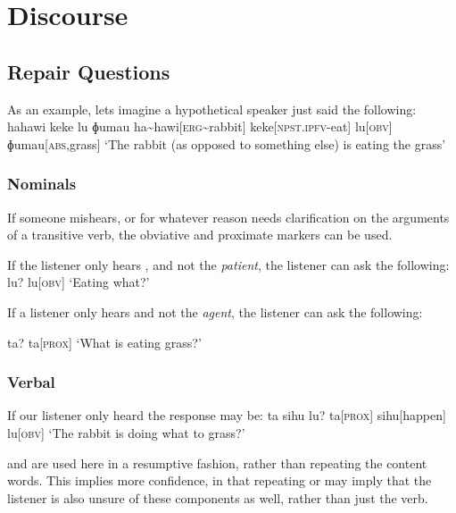 
\chapter{Discourse}

\section{Repair Questions}
As an example, lets imagine a hypothetical speaker just said the following:
\ex
\begingl
\glpreamble hahawi keke lu ɸumau
\endpreamble
ha\textasciitilde hawi[\textsc{erg\textasciitilde}rabbit]
keke[\textsc{npst.ipfv-}eat]
lu[\textsc{obv}]
ɸumau[\textsc{abs,}grass]
\glft `The rabbit (as opposed to something else) is eating the grass'
\endgl
\xe

\subsection{Nominals}

If someone mishears, or for whatever reason needs clarification on the arguments of a transitive verb, the obviative and proximate markers can be used.

\begin{paracol}{2}
If the listener only hears , and not the \textit{patient}, the listener can ask the following:
\ex
\begingl
\glpreamble lu?
\endpreamble
lu[\textsc{obv}]
\glft `Eating what?'
\endgl
\xe
\switchcolumn

If a listener only hears  and not the \textit{agent}, the listener can ask the following:

\ex
\begingl
\glpreamble ta?
\endpreamble
ta[\textsc{prox}]
\glft `What is eating grass?'
\endgl
\xe
\end{paracol}

\subsection{Verbal}
If our listener only heard  the response may be:
\ex
\begingl
\glpreamble ta sihu lu?
\endpreamble
ta[\textsc{prox}]
sihu[happen]
lu[\textsc{obv}]
\glft `The rabbit is doing what to grass?'
\endgl
\xe

 and  are used here in a resumptive fashion, rather than repeating the content words. This implies more confidence, in that repeating  or  may imply that the listener is also unsure of these components as well, rather than just the verb.

